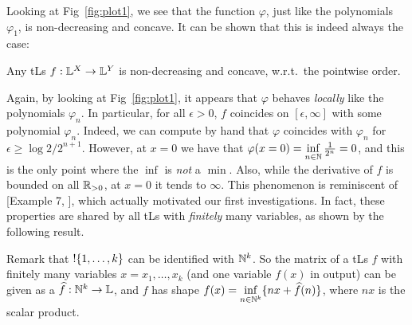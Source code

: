 % 

Looking at Fig~\ref{fig:plot1}, we see that the function $\varphi$, just like the polynomials $\varphi_{1}$, is non-decreasing and concave.
It can be shown that this is indeed always the case:

\begin{proposition}\label{prop:nondecr+conc}
 Any tLs $f:\mathbb{L}^X\to\mathbb{L}^Y$ is non-decreasing and concave, w.r.t.\ the pointwise order.
\end{proposition}

Again, by looking at Fig~\ref{fig:plot1}, it appears that $\varphi$ behaves \emph{locally} like the polynomials $\varphi_{n}$. In particular, for all $\epsilon >0$, $f$ coincides on $[\epsilon,\infty]$ with some polynomial $\varphi_{n}$. Indeed, we can compute  by hand that $\varphi$ coincides with $\varphi_{n}$ 
for $\epsilon \geq \log2/2^{n+1}$.
However, at
%
 $x=0$ we have that $\varphi(x=0)=\inf\limits_{n\in\mathbb{N}} \frac{1}{2^n}=0$, and this is the only point where the $\inf$ is \emph{not} a $\min$.
Also, while the derivative of $f$ is bounded on all $\mathbb{R}_{>0}$, at $x=0$ it tends to $\infty$.
This phenomenon is reminiscent of [Example 7, \cite{Ehrhard2005}],
which actually motivated our first investigations.
In fact, these properties are shared by all tLs with \emph{finitely} many variables, as shown by the following result.


Remark that $!\{1,\dots,k\}$ can be identified with $\mathbb{N}^k$.
So the matrix of a tLs $f$ with finitely many variables $x=x_1,\dots,x_k$ (and one variable $f(x)$ in output) can be given as a $\widehat f:\mathbb{N}^k\to\mathbb{L}$, and $f$ has shape $f(x)=\inf\limits_{n\in \mathbb{N}^k}\{nx+\widehat f(n)\}$, where $nx$ is the scalar product.

